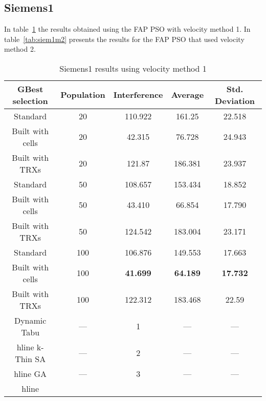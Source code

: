 \subsection{Siemens1}
In table~\ref{tab:siem1m1} the results obtained using the FAP PSO with velocity method 1. In table~\ref{tab:siem1m2} presents the results for the FAP PSO that used velocity method 2.
\begin{table}[H]
\centering
	\begin{tabular}{| c | c | c | c | c |}
	\hline
	GBest selection & Population & Interference & Average & Std. Deviation\\ \hline
	Standard & 20 & 110.922 & 161.25 & 22.518 \\ \hline
	Built with cells & 20 & 42.315 & 76.728 & 24.943\\ \hline
	Built with TRXs & 20 & 121.87 & 186.381 & 23.937\\ \hline
	Standard & 50 & 108.657 & 153.434 & 18.852\\ \hline
	Built with cells & 50 & 43.410 & 66.854 & 17.790\\ \hline
	Built with TRXs & 50 & 124.542 & 183.004 & 23.171\\ \hline
	Standard & 100 & 106.876 & 149.553 & 17.663\\ \hline
	Built with cells & 100 & \textbf{41.699} & \textbf{64.189} & \textbf{17.732}\\ \hline
	Built with TRXs & 100 & 122.312 & 183.468 & 22.59\\ \hline
    Dynamic Tabu & --- & 1 & --- & --- \\hline
    k-Thin SA & --- & 2 & --- & --- \\hline
    GA & --- & 3 & --- & --- \\hline
	\end{tabular}
	\caption{Siemens1 results using velocity method 1}
	\label{tab:siem1m1}
\end{table}
